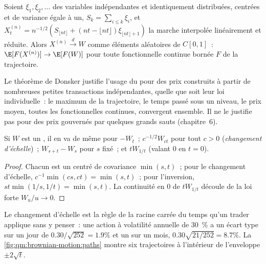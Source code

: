 \begin{theorem}\label{thm:qm:brownian-motion:donsker}
Soient $\xi_1, \xi_2, \dots$ des variables indépendantes et identiquement distribuées, centrées et
de variance égale à un, $S_k = \sum_{i \le k}\xi_i$, et $X^{(n)}_t = n^{-1/2}(S_{\lfloor nt\rfloor} +
(nt - \lfloor nt\rfloor)\xi_{\lfloor nt\rfloor + 1})$ la marche interpolée linéairement et réduite.
Alors $X^{(n)} \xrightarrow{d} W$ comme éléments aléatoires de $C[0, 1]$~: $\E[F(X^{(n)})] \to
\E[F(W)]$ pour toute fonctionnelle continue bornée $F$ de la trajectoire.
\end{theorem}

\admitted

Le théorème de Donsker justifie l'usage du  pour des prix construits à partir de
nombreuses petites transactions indépendantes, quelle que soit leur loi individuelle~: le maximum de la
trajectoire, le temps passé sous un niveau, le prix moyen, toutes les fonctionnelles continues, convergent ensemble. Il
ne le justifie pas pour des prix gouvernés par quelques grands sauts (chapitre~6).

\begin{proposition}[Invariances]\label{prop:qm:brownian-motion:scaling}
Si $W$ est un , il en va de même pour $-W_t$~; $c^{-1/2}W_{ct}$ pour tout $c > 0$
(\emph{changement d'échelle})~; $W_{s+t} - W_s$ pour $s$ fixé~; et $tW_{1/t}$ (valant 0 en $t = 0$).
\end{proposition}

\begin{proof}
Chacun est un  centré de covariance $\min(s,t)$~; pour le changement d'échelle, $c^{-1}\min(cs,
ct) = \min(s,t)$~; pour l'inversion, $st\min(1/s,1/t) = \min(s,t)$. La continuité en 0 de $tW_{1/t}$
découle de la loi forte $W_u/u \to 0$.
\end{proof}

Le changement d'échelle est la règle de la racine carrée du temps qu'un trader applique sans y penser~: une
action à volatilité annuelle de 30~\% a un écart type sur un jour de $0.30/\sqrt{252} = 1.9\%$ et un
sur un mois, $0.30\sqrt{21/252} = 8.7\%$. La \cref{fig:qm:brownian-motion:paths} montre six
trajectoires à l'intérieur de l'enveloppe $\pm 2\sqrt t$.

